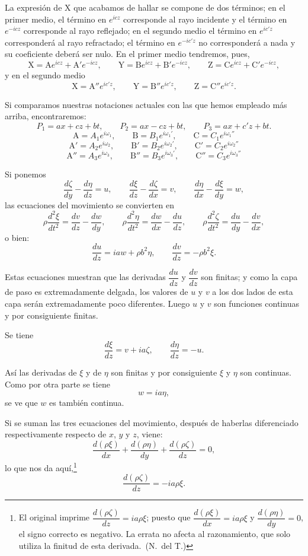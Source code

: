 La expresión de X que acabamos de hallar se compone de dos términos; en el
primer medio, el término en $e^{icz}$ corresponde al rayo incidente y el
término en $e^{-icz}$ corresponde al rayo reflejado; en el segundo medio
el término en $e^{ic'z}$ corresponderá al rayo refractado; el término en
$e^{-ic'z}$ no corresponderá a nada y su coeficiente deberá ser nulo. En
el primer medio tendremos, pues,
\[
\mathrm{X}=\mathrm{A}e^{icz}+\mathrm{A}'e^{-icz},\qquad
\mathrm{Y}=\mathrm{B}e^{icz}+\mathrm{B}'e^{-icz},\qquad
\mathrm{Z}=\mathrm{C}e^{icz}+\mathrm{C}'e^{-icz},
\]
y en el segundo medio
\[
\mathrm{X}=\mathrm{A}''e^{ic'z},\qquad \mathrm{Y}=\mathrm{B}''e^{ic'z},\qquad
\mathrm{Z}=\mathrm{C}''e^{ic'z}.
\]

Si comparamos nuestras notaciones actuales con las que hemos empleado más
arriba, encontraremos:
\[
P_1=ax+cz+bt,\qquad P_2=ax-cz+bt,\qquad P_3=ax+c'z+bt.
\]
\[
\mathrm{A}=A_1e^{i\omega_1},\qquad \mathrm{B}=B_1e^{i\omega_1'},\qquad
\mathrm{C}=C_1e^{i\omega_1''}
\]
\[
\mathrm{A}'=A_2e^{i\omega_2},\qquad \mathrm{B}'=B_2e^{i\omega_2'},\qquad
\mathrm{C}'=C_2e^{i\omega_2''}
\]
\[
\mathrm{A}''=A_3e^{i\omega_3},\qquad \mathrm{B}''=B_3e^{i\omega_3'},\qquad
\mathrm{C}''=C_3e^{i\omega_3''}
\]

Si ponemos
\[
\frac{d\zeta}{dy}-\frac{d\eta}{dz}=u,\qquad
\frac{d\xi}{dz}-\frac{d\zeta}{dx}=v,\qquad
\frac{d\eta}{dx}-\frac{d\xi}{dy}=w,
\]
las ecuaciones del movimiento se convierten en
\[
\rho\frac{d^2\xi}{dt^2}=\frac{dv}{dz}-\frac{dw}{dy},\qquad
\rho\frac{d^2\eta}{dt^2}=\frac{dw}{dx}-\frac{du}{dz},\qquad
\rho\frac{d^2\zeta}{dt^2}=\frac{du}{dy}-\frac{dv}{dx},
\]
o bien:
\[
\frac{du}{dz}=ia w+\rho b^2\eta,\qquad \frac{dv}{dz}=-\rho b^2\xi.
\]

Estas ecuaciones muestran que las derivadas $\dfrac{du}{dz}$ y
$\dfrac{dv}{dz}$ son finitas; y como la capa de paso es extremadamente
delgada, los valores de $u$ y $v$ a los dos lados de esta capa serán
extremadamente poco diferentes. Luego $u$ y $v$ son funciones continuas y
por consiguiente finitas.

Se tiene
\[
\frac{d\xi}{dz}=v+ia\zeta,\qquad \frac{d\eta}{dz}=-u.
\]

Así las derivadas de $\xi$ y de $\eta$ son finitas y por consiguiente
$\xi$ y $\eta$ son continuas. Como por otra parte se tiene
\[
w=ia\eta,
\]
se ve que $w$ es también continua.

Si se suman las tres ecuaciones del movimiento, después de haberlas
diferenciado respectivamente respecto de $x$, $y$ y $z$, viene:
\[
\frac{d(\rho\xi)}{dx}+\frac{d(\rho\eta)}{dy}+\frac{d(\rho\zeta)}{dz}=0,
\]
lo que nos da aquí,\footnote{El original imprime
$\dfrac{d(\rho\zeta)}{dz}=ia\rho\xi$; puesto que
$\dfrac{d(\rho\xi)}{dx}=ia\rho\xi$ y $\dfrac{d(\rho\eta)}{dy}=0$, el signo
correcto es negativo. La errata no afecta al razonamiento, que solo
utiliza la finitud de esta derivada.~(N.~del T.)}
\[
\frac{d(\rho\zeta)}{dz}=-ia\rho\xi.
\]

